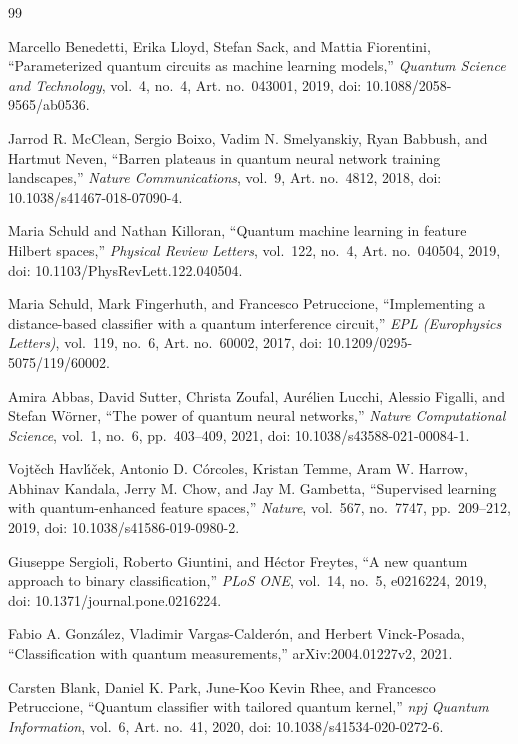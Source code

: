 \documentclass[conference]{IEEEtran}
\begin{document}
\clearpage

\begin{thebibliography}{99}

Marcello Benedetti, Erika Lloyd, Stefan Sack, and Mattia Fiorentini, ``Parameterized quantum circuits as machine learning models,'' \emph{Quantum Science and Technology}, vol.~4, no.~4, Art. no.~043001, 2019, doi: 10.1088/2058-9565/ab0536.

Jarrod R. McClean, Sergio Boixo, Vadim N. Smelyanskiy, Ryan Babbush, and Hartmut Neven, ``Barren plateaus in quantum neural network training landscapes,'' \emph{Nature Communications}, vol.~9, Art. no.~4812, 2018, doi: 10.1038/s41467-018-07090-4.

Maria Schuld and Nathan Killoran, ``Quantum machine learning in feature Hilbert spaces,'' \emph{Physical Review Letters}, vol.~122, no.~4, Art. no.~040504, 2019, doi: 10.1103/PhysRevLett.122.040504.

Maria Schuld, Mark Fingerhuth, and Francesco Petruccione, ``Implementing a distance-based classifier with a quantum interference circuit,'' \emph{EPL (Europhysics Letters)}, vol.~119, no.~6, Art. no.~60002, 2017, doi: 10.1209/0295-5075/119/60002.

Amira Abbas, David Sutter, Christa Zoufal, Aur\'elien Lucchi, Alessio Figalli, and Stefan W\"{o}rner, ``The power of quantum neural networks,'' \emph{Nature Computational Science}, vol.~1, no.~6, pp.~403--409, 2021, doi: 10.1038/s43588-021-00084-1.

Vojt\v{e}ch Havl\'{\i}\v{c}ek, Antonio D. C\'orcoles, Kristan Temme, Aram W. Harrow, Abhinav Kandala, Jerry M. Chow, and Jay M. Gambetta, ``Supervised learning with quantum-enhanced feature spaces,'' \emph{Nature}, vol.~567, no.~7747, pp.~209--212, 2019, doi: 10.1038/s41586-019-0980-2.

Giuseppe Sergioli, Roberto Giuntini, and H\'ector Freytes, ``A new quantum approach to binary classification,'' \emph{PLoS ONE}, vol.~14, no.~5, e0216224, 2019, doi: 10.1371/journal.pone.0216224.

Fabio A. Gonz\'alez, Vladimir Vargas-Calder\'on, and Herbert Vinck-Posada, ``Classification with quantum measurements,'' arXiv:2004.01227v2, 2021.

Carsten Blank, Daniel K. Park, June-Koo Kevin Rhee, and Francesco Petruccione, ``Quantum classifier with tailored quantum kernel,'' \emph{npj Quantum Information}, vol.~6, Art. no.~41, 2020, doi: 10.1038/s41534-020-0272-6.


\end{thebibliography}
\end{document}
